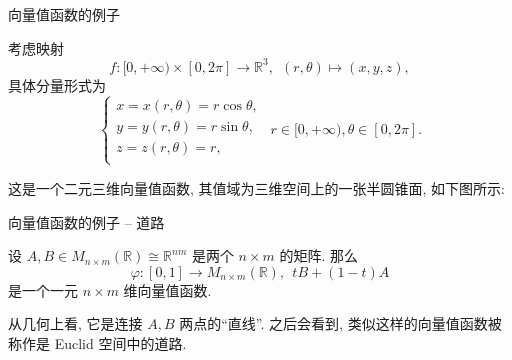 \begin{frame}{向量值函数的例子}


考虑映射
\[f: [0, +\infty) \times [0, 2\pi] \longrightarrow \mathbb{R}^3, ~~ (r, \theta) \mapsto (x, y, z),\]
具体分量形式为
\[
\begin{cases}
x = x(r, \theta) = r \cos\theta, \\
y = y(r, \theta) = r \sin\theta, \\
z = z(r, \theta) = r, \\
\end{cases}
~~ r \in [0, +\infty), \theta \in [0, 2\pi].
\]

这是一个二元三维向量值函数,
\pause
其值域为三维空间上的一张半圆锥面, 如下图所示:

\begin{center}
\end{center}

\end{frame}


\begin{frame}{向量值函数的例子 -- 道路}

设 $A, B \in M_{n\times m}(\mathbb{R}) \cong \mathbb{R}^{nm}$ 是两个 $n\times m$ 的矩阵. 那么
\[\varphi: [0, 1] \longrightarrow M_{n\times m}(\mathbb{R}), ~~ tB + (1-t)A\]
是一个一元 $n\times m$ 维向量值函数.

\pause
\vspace{1em}

从几何上看, 它是连接 $A, B$ 两点的``直线''. 之后会看到, 类似这样的向量值函数被称作是 Euclid 空间中的道路.

\end{frame}


